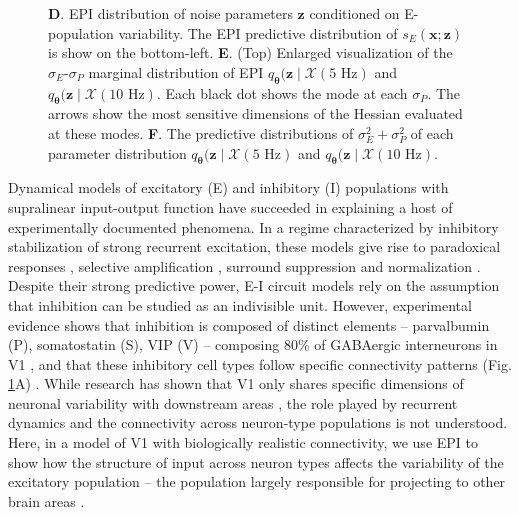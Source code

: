 \documentclass[11pt]{article}
\begin{document}
\begin{figure}
{\textbf{D}. EPI distribution of noise parameters $\mathbf{z}$ conditioned on E-population variability.
The EPI predictive distribution of $s_E(\mathbf{x}; \mathbf{z})$ is show on the bottom-left.
\textbf{E}. (Top) Enlarged visualization of the $\sigma_E$-$\sigma_P$ marginal distribution of EPI $q_{\bm{\theta}}(\mathbf{z} \mid \mathcal{X}(5\text{ Hz})$ and $q_{\bm{\theta}}(\mathbf{z} \mid \mathcal{X}(10\text{ Hz})$.
Each black dot shows the mode at each $\sigma_P$.
The arrows show the most sensitive dimensions of the Hessian evaluated at these modes.
\textbf{F}. The predictive distributions of $\sigma_E^2 + \sigma_P^2$ of each parameter distribution $q_{\bm{\theta}}(\mathbf{z} \mid \mathcal{X}(5\text{ Hz})$ and $q_{\bm{\theta}}(\mathbf{z} \mid \mathcal{X}(10\text{ Hz})$.
}
 \label{fig:V1}
\end{figure}

Dynamical models of excitatory (E) and inhibitory (I) populations with supralinear input-output function have succeeded in explaining a host of experimentally documented phenomena.
In a regime characterized by inhibitory stabilization of strong recurrent excitation, these models give rise to paradoxical responses \cite{tsodyks1997paradoxical}, selective amplification  \cite{goldman2009memory, murphy2009balanced}, surround suppression \cite{ozeki2009inhibitory} and normalization \cite{rubin2015stabilized}. 
Despite their strong predictive power, E-I circuit models rely on the assumption that inhibition can be studied as an indivisible unit. 
However, experimental evidence shows that inhibition is composed of distinct elements -- parvalbumin (P), somatostatin (S), VIP (V) --
composing 80\% of GABAergic interneurons in V1 \cite{markram2004interneurons, rudy2011three, tremblay2016}, and that these inhibitory cell types follow specific connectivity patterns (Fig. \ref{fig:V1}A) \cite{pfeffer2013inhibition}.
While research has shown that V1 only shares specific dimensions of neuronal variability with downstream areas \cite{semedo2019cortical}, the role played by recurrent dynamics and the connectivity across neuron-type populations is not understood.
Here, in a model of V1 with biologically realistic connectivity, we use EPI to show how the structure of input across neuron types affects the variability of the excitatory population -- the population largely responsible for projecting to other brain areas \cite{felleman1991distributed}.
\end{document}

